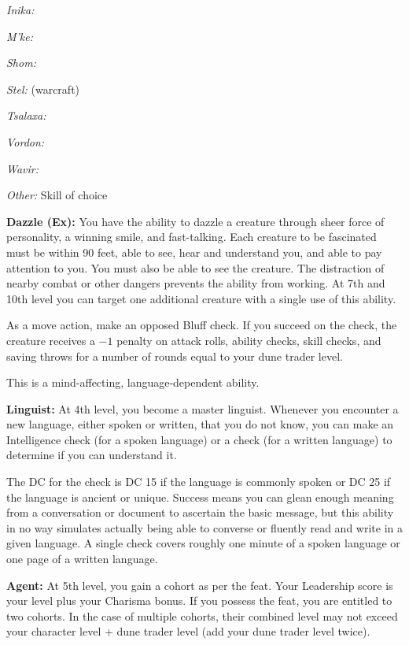 {\textit{Inika:} 

\textit{M'ke:} 

\textit{Shom:} 

\textit{Stel:}  (warcraft)

\textit{Tsalaxa:} 

\textit{Vordon:} 

\textit{Wavir:} 

\textit{Other:} Skill of choice

\textbf{Dazzle (Ex):} You have the ability to dazzle a creature through sheer force of personality, a winning smile, and fast-talking. Each creature to be fascinated must be within 90 feet, able to see, hear and understand you, and able to pay attention to you. You must also be able to see the creature. The distraction of nearby combat or other dangers prevents the ability from working. At 7th and 10th level you can target one additional creature with a single use of this ability.

As a move action, make an opposed Bluff check. If you succeed on the check, the creature receives a $-1$ penalty on attack rolls, ability checks, skill checks, and saving throws for a number of rounds equal to your dune trader level.

This is a mind-affecting, language-dependent ability.

\textbf{Linguist:} At 4th level, you become a master linguist. Whenever you encounter a new language, either spoken or written, that you do not know, you can make an Intelligence check (for a spoken language) or a  check (for a written language) to determine if you can understand it.

The DC for the check is DC 15 if the language is commonly spoken or DC 25 if the language is ancient or unique. Success means you can glean enough meaning from a conversation or document to ascertain the basic message, but this ability in no way simulates actually being able to converse or fluently read and write in a given language. A single check covers roughly one minute of a spoken language or one page of a written language.

\textbf{Agent:} At 5th level, you gain a cohort as per the  feat. Your Leadership score is your level plus your Charisma bonus. If you possess the  feat, you are entitled to two cohorts. In the case of multiple cohorts, their combined level may not exceed your character level + dune trader level (add your dune trader level twice).

}

